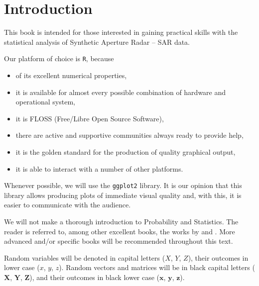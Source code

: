 \chapter{Introduction}\label{Chapter:Introduction}

This book is intended for those interested in gaining practical skills with the statistical analysis of Synthetic Aperture Radar -- SAR data.

Our platform of choice is \texttt R, because
\begin{itemize}
\item of its excellent numerical properties\cite{AlmironSilvaMM:2009,OctaveScilabMatlabCAM},
\item it is available for almost every possible combination of hardware and operational system,
\item it is FLOSS (Free/Libre Open Source Software),
\item there are active and supportive communities always ready to provide help,
\item it is the golden standard for the production of quality graphical output,
\item it is able to interact with a number of other platforms.
\end{itemize}

Whenever possible, we will use the \texttt{ggplot2} library\cite{HitchhikerGuideGGPLO2,ggplot2Wickman}.
It is our opinion that this library allows producing plots of immediate visual quality and, with this, it is easier to communicate with the audience.

We will not make a thorough introduction to Probability and Statistics.
The reader is referred to, among other excellent books, the works by
\citet{BickelDocksum77} and
\citet{ModernIntroProbStat:Dekkingetal:2005}.
More advanced and/or specific books will be recommended throughout this text.


Random variables will be denoted in capital letters ($X$, $Y$, $Z$),
their outcomes in lower case ($x$, $y$, $z$).
Random vectors and matrices will be in black capital letters ($\bm X$, $\bm Y$, $\bm Z$), and their outcomes in black lower case ($\bm x$, $\bm y$, $\bm z$).


